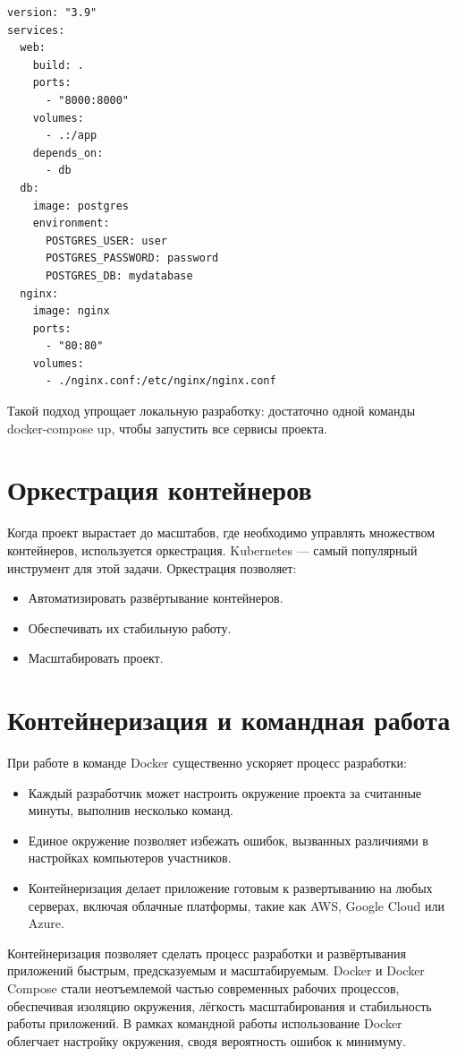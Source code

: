 \begin{verbatim}
version: "3.9"
services:
  web:
    build: .
    ports:
      - "8000:8000"
    volumes:
      - .:/app
    depends_on:
      - db
  db:
    image: postgres
    environment:
      POSTGRES_USER: user
      POSTGRES_PASSWORD: password
      POSTGRES_DB: mydatabase
  nginx:
    image: nginx
    ports:
      - "80:80"
    volumes:
      - ./nginx.conf:/etc/nginx/nginx.conf
\end{verbatim}

Такой подход упрощает локальную разработку: достаточно одной команды docker-compose up, чтобы запустить все сервисы проекта.

\section{Оркестрация контейнеров}
Когда проект вырастает до масштабов, где необходимо управлять множеством контейнеров, используется оркестрация. Kubernetes — самый популярный инструмент для этой задачи. Оркестрация позволяет:
\begin{itemize}
    \item Автоматизировать развёртывание контейнеров.
    \item Обеспечивать их стабильную работу.
    \item Масштабировать проект.
\end{itemize}

\section{Контейнеризация и командная работа}
При работе в команде Docker существенно ускоряет процесс разработки:
\begin{itemize}
    \item Каждый разработчик может настроить окружение проекта за считанные минуты, выполнив несколько команд.
    \item Единое окружение позволяет избежать ошибок, вызванных различиями в настройках компьютеров участников.
    \item Контейнеризация делает приложение готовым к развертыванию на любых серверах, включая облачные платформы, такие как AWS, Google Cloud или Azure.
\end{itemize}

Контейнеризация позволяет сделать процесс разработки и развёртывания приложений быстрым, предсказуемым и масштабируемым. Docker и Docker Compose стали неотъемлемой частью современных рабочих процессов, обеспечивая изоляцию окружения, лёгкость масштабирования и стабильность работы приложений. В рамках командной работы использование Docker облегчает настройку окружения, сводя вероятность ошибок к минимуму.

